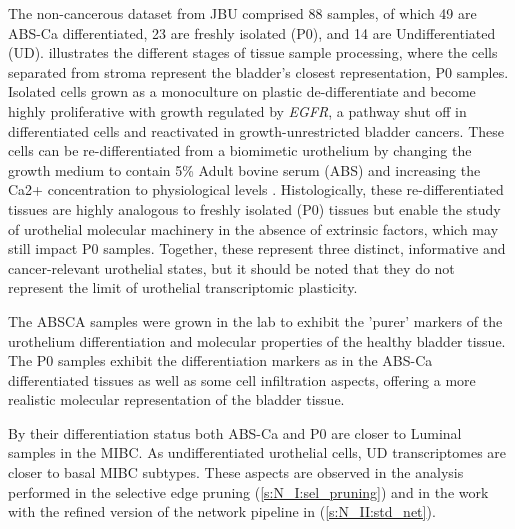 The non-cancerous dataset from JBU comprised 88 samples, of which 49 are ABS-Ca differentiated, 23 are freshly isolated (P0), and 14 are Undifferentiated (UD).  illustrates the different stages of tissue sample processing, where the cells separated from stroma represent the bladder's closest representation, \gls{P0} samples. Isolated cells grown as a monoculture on plastic de-differentiate and become highly proliferative with growth regulated by \textit{EGFR}, a pathway shut off in differentiated cells and reactivated in growth-unrestricted bladder cancers. These cells can be re-differentiated from a biomimetic urothelium by changing the growth medium to contain 5\% Adult bovine serum (ABS) and increasing the Ca2+ concentration to physiological levels \citep{Cross2005-fe}. Histologically, these re-differentiated tissues are highly analogous to freshly isolated (P0) tissues but enable the study of urothelial molecular machinery in the absence of extrinsic factors, which may still impact P0 samples. Together, these represent three distinct, informative and cancer-relevant urothelial states, but it should be noted that they do not represent the limit of urothelial transcriptomic plasticity.


The \gls{ABSCA} samples were grown in the lab to exhibit the 'purer' markers of the urothelium differentiation and molecular properties of the healthy bladder tissue. The P0 samples exhibit the differentiation markers as in the ABS-Ca differentiated tissues as well as some cell infiltration aspects, offering a more realistic molecular representation of the bladder tissue. 

By their differentiation status both ABS-Ca and P0 are closer to Luminal samples in the MIBC. As undifferentiated urothelial cells, \gls{UD} transcriptomes are closer to basal MIBC subtypes. These aspects are observed in the analysis performed in the selective edge pruning (\cref{s:N_I:sel_pruning}) and in the work with the refined version of the network pipeline in (\cref{s:N_II:std_net}).

